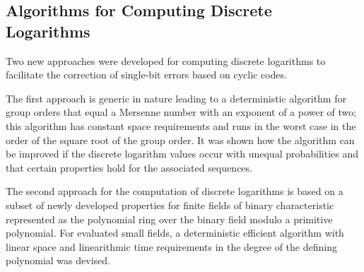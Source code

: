 \documentclass[a4paper, 11pt]{article}
\begin{document}
\subsection{Algorithms for Computing Discrete Logarithms}

Two new approaches were developed for computing discrete logarithms to facilitate the correction of single-bit errors based on cyclic codes.

The first approach is generic in nature leading to a deterministic algorithm for group orders that equal a Mersenne number with an exponent of a power of two; this algorithm has constant space requirements and runs in the worst case in the order of the square root of the group order. It was shown how the algorithm can be improved if the discrete logarithm values occur with unequal probabilities and that certain properties hold for the associated sequences.

The second approach for the computation of discrete logarithms is based on a subset of newly developed properties for finite fields of binary characteristic represented as the polynomial ring over the binary field modulo a primitive polynomial. For evaluated small fields, a deterministic efficient algorithm with linear space and linearithmic time requirements in the degree of the defining polynomial was devised.

\newpage
%
%
%

\newpage


\end{document}
